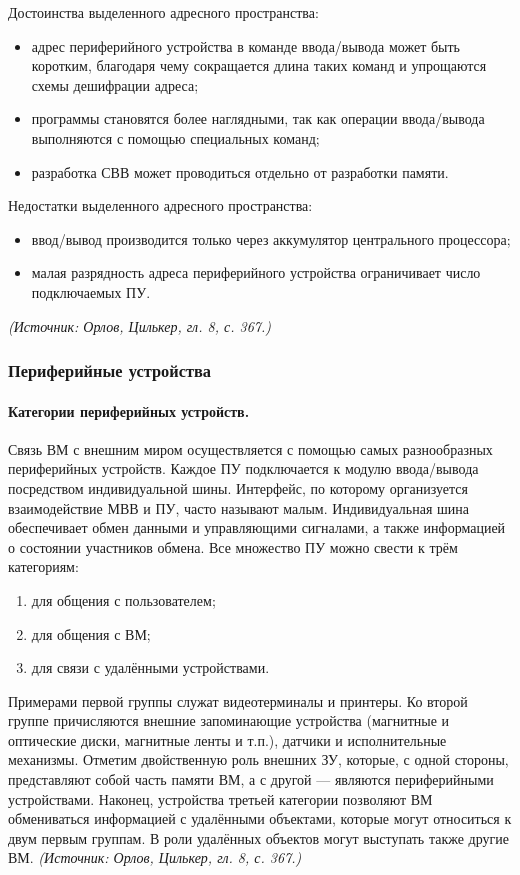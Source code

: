 \documentclass[a4paper,12pt]{article}
\begin{document}
Достоинства выделенного адресного пространства:
\begin{itemize}
\item адрес периферийного устройства в команде ввода/вывода может быть коротким, благодаря чему сокращается длина таких команд и упрощаются схемы дешифрации адреса;
\item программы становятся более наглядными, так как операции ввода/вывода выполняются с помощью специальных команд;
\item разработка СВВ может проводиться отдельно от разработки памяти.
\end{itemize}
Недостатки выделенного адресного пространства:
\begin{itemize}
\item ввод/вывод производится только через аккумулятор центрального процессора;
\item малая разрядность адреса периферийного устройства ограничивает число подключаемых ПУ.
\end{itemize}
\textit{(Источник: Орлов, Цилькер, гл. 8, с. 367.)}

\subsubsection{Периферийные устройства}

\paragraph{Категории периферийных устройств.}
Связь ВМ с внешним миром осуществляется с помощью самых разнообразных периферийных устройств. Каждое ПУ подключается к модулю ввода/вывода посредством индивидуальной шины. Интерфейс, по которому организуется взаимодействие МВВ и ПУ, часто называют малым. Индивидуальная шина обеспечивает обмен данными и управляющими сигналами, а также информацией о состоянии участников обмена. Все множество ПУ можно свести к трём категориям:
\begin{enumerate}[label=\arabic*)]
\item для общения с пользователем;
\item для общения с ВМ;
\item для связи с удалёнными устройствами.
\end{enumerate}
Примерами первой группы служат видеотерминалы и принтеры. Ко второй группе причисляются внешние запоминающие устройства (магнитные и оптические диски, магнитные ленты и т.п.), датчики и исполнительные механизмы. Отметим двойственную роль внешних ЗУ, которые, с одной стороны, представляют собой часть памяти ВМ, а с другой — являются периферийными устройствами. Наконец, устройства третьей категории позволяют ВМ обмениваться информацией с удалёнными объектами, которые могут относиться к двум первым группам. В роли удалённых объектов могут выступать также другие ВМ.
\textit{(Источник: Орлов, Цилькер, гл. 8, с. 367.)}
\end{document}
